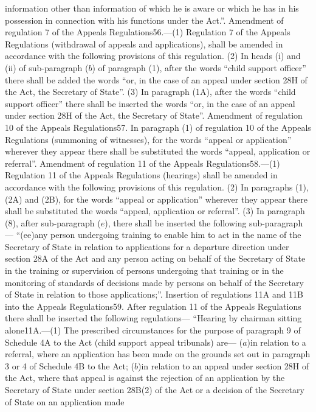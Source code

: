 \documentclass[a4paper]{article}
\begin{document}
information other than information of which he is aware or which he has in his
possession in connection with his functions under the Act.”.
Amendment of regulation 7 of the Appeals Regulations56.—(1) Regulation 7 of the
Appeals Regulations (withdrawal of appeals and applications), shall be amended
in accordance with the following provisions of this regulation.
(2) In heads (i) and (ii) of sub-paragraph ($b$) of paragraph (1), after the words
“child support officer” there shall be added the words “or, in the case of an
appeal under section 28H of the Act, the Secretary of State”.
(3) In paragraph (1A), after the words “child support officer” there shall be
inserted the words “or, in the case of an appeal under section 28H of the Act,
the Secretary of State”.
Amendment of regulation 10 of the Appeals Regulations57. In paragraph (1) of
regulation 10 of the Appeals Regulations (summoning of witnesses), for the words
“appeal or application” wherever they appear there shall be substituted the
words “appeal, application or referral”.
Amendment of regulation 11 of the Appeals Regulations58.—(1) Regulation 11 of
the Appeals Regulations (hearings) shall be amended in accordance with the
following provisions of this regulation.
(2) In paragraphs (1), (2A) and (2B), for the words “appeal or application”
wherever they appear there shall be substituted the words “appeal, application
or referral”.
(3) In paragraph (8), after sub-paragraph ($e$), there shall be inserted the
following sub-paragraph—
“(ee)any person undergoing training to enable him to act in the name of the
Secretary of State in relation to applications for a departure direction under
section 28A of the Act and any person acting on behalf of the Secretary of State
in the training or supervision of persons undergoing that training or in the
monitoring of standards of decisions made by persons on behalf of the Secretary
of State in relation to those applications;”.
Insertion of regulations 11A and 11B into the Appeals Regulations59. After
regulation 11 of the Appeals Regulations there shall be inserted the following
regulations—
“Hearing by chairman sitting alone11A.—(1) The prescribed circumstances for the
purpose of paragraph 9 of Schedule 4A to the Act (child support appeal
tribunals) are—
($a$)in relation to a referral, where an application has been made on the grounds
set out in paragraph 3 or 4 of Schedule 4B to the Act;
($b$)in relation to an appeal under section 28H of the Act, where that appeal is
against the rejection of an application by the Secretary of State under section
28B(2) of the Act or a decision of the Secretary of State on an application made
\end{document}

